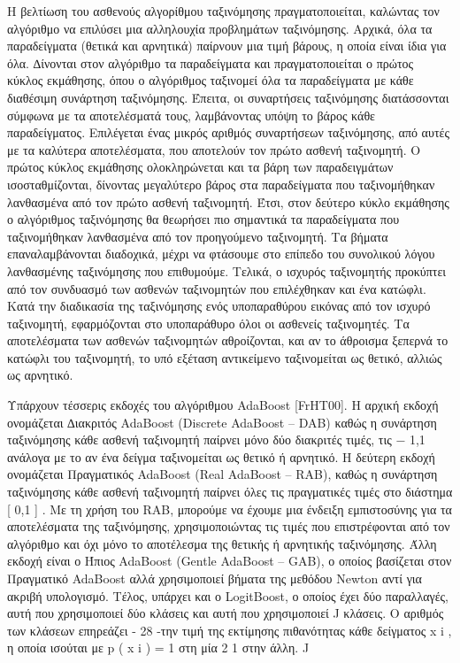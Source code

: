 Η βελτίωση του ασθενούς αλγορίθμου ταξινόμησης πραγματοποιείται, καλώντας τον
αλγόριθμο να επιλύσει μια αλληλουχία προβλημάτων ταξινόμησης. Αρχικά, όλα τα παραδείγματα
(θετικά και αρνητικά) παίρνουν μια τιμή βάρους, η οποία είναι ίδια για όλα. ∆ίνονται στον
αλγόριθμο τα παραδείγματα και πραγματοποιείται ο πρώτος κύκλος εκμάθησης, όπου ο
αλγόριθμος ταξινομεί όλα τα παραδείγματα με κάθε διαθέσιμη συνάρτηση ταξινόμησης. Έπειτα,
οι συναρτήσεις ταξινόμησης διατάσσονται σύμφωνα με τα αποτελέσματά τους, λαμβάνοντας υπόψη
το βάρος κάθε παραδείγματος. Επιλέγεται ένας μικρός αριθμός συναρτήσεων ταξινόμησης, από
αυτές με τα καλύτερα αποτελέσματα, που αποτελούν τον πρώτο ασθενή ταξινομητή. Ο πρώτος
κύκλος εκμάθησης ολοκληρώνεται και τα βάρη των παραδειγμάτων ισοσταθμίζονται, δίνοντας
μεγαλύτερο βάρος στα παραδείγματα που ταξινομήθηκαν λανθασμένα από τον πρώτο ασθενή
ταξινομητή. Έτσι, στον δεύτερο κύκλο εκμάθησης ο αλγόριθμος ταξινόμησης θα θεωρήσει πιο
σημαντικά τα παραδείγματα που ταξινομήθηκαν λανθασμένα από τον προηγούμενο ταξινομητή.
Τα βήματα επαναλαμβάνονται διαδοχικά, μέχρι να φτάσουμε στο επίπεδο του συνολικού λόγου
λανθασμένης ταξινόμησης που επιθυμούμε. Τελικά, ο ισχυρός ταξινομητής προκύπτει από τον
συνδυασμό των ασθενών ταξινομητών που επιλέχθηκαν και ένα κατώφλι. Κατά την διαδικασία της
ταξινόμησης ενός υποπαραθύρου εικόνας από τον ισχυρό ταξινομητή, εφαρμόζονται στο
υποπαράθυρο όλοι οι ασθενείς ταξινομητές. Τα αποτελέσματα των ασθενών ταξινομητών
αθροίζονται, και αν το άθροισμα ξεπερνά το κατώφλι του ταξινομητή, το υπό εξέταση αντικείμενο
ταξινομείται ως θετικό, αλλιώς ως αρνητικό.

Υπάρχουν τέσσερις εκδοχές του αλγόριθμου AdaBoost [FrHT00]. Η αρχική εκδοχή
ονομάζεται ∆ιακριτός AdaBoost (Discrete AdaBoost – DAB) καθώς η συνάρτηση ταξινόμησης
κάθε ασθενή ταξινομητή παίρνει μόνο δύο διακριτές τιμές, τις { − 1,1  } ανάλογα με το αν ένα
δείγμα ταξινομείται ως θετικό ή αρνητικό. Η δεύτερη εκδοχή ονομάζεται Πραγματικός AdaBoost
(Real AdaBoost – RAB), καθώς η συνάρτηση ταξινόμησης κάθε ασθενή ταξινομητή παίρνει όλες
τις πραγματικές τιμές στο διάστημα [ 0,1  ] . Με τη χρήση του RAB, μπορούμε να έχουμε μια
ένδειξη εμπιστοσύνης για τα αποτελέσματα της ταξινόμησης, χρησιμοποιώντας τις τιμές που
επιστρέφονται από τον αλγόριθμο και όχι μόνο το αποτέλεσμα της θετικής ή αρνητικής
ταξινόμησης. Άλλη εκδοχή είναι ο Ήπιος AdaBoost (Gentle AdaBoost – GAB), ο οποίος
βασίζεται στον Πραγματικό AdaBoost αλλά χρησιμοποιεί βήματα της μεθόδου Newton αντί για
ακριβή υπολογισμό. Τέλος, υπάρχει και ο LogitBoost, ο οποίος έχει δύο παραλλαγές, αυτή που
χρησιμοποιεί δύο κλάσεις και αυτή που χρησιμοποιεί J κλάσεις. Ο αριθμός των κλάσεων επηρεάζει
- 28 -την τιμή της εκτίμησης πιθανότητας κάθε δείγματος x i , η οποία ισούται με p ( x i  ) =
1
στη μία
2
1
στην άλλη.
J

